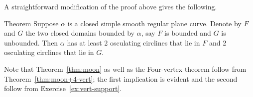 A straightforward modification of the proof above gives the following.

\begin{thm}{Theorem}\label{thm:moon+4-vert}
Suppose $\alpha$ is a closed simple smooth regular plane curve.
Denote by $F$ and $G$ the two closed domains bounded by $\alpha$, say $F$ is bounded and $G$ is unbounded.  
Then $\alpha$ has at least 2 osculating circlines that lie in $F$
and  2 osculating circlines that lie in $G$. 
\end{thm}

Note that Theorem~\ref{thm:moon} as well as the Four-vertex theorem \label{thm:4-vert} follow from Theorem~\ref{thm:moon+4-vert};
the first implication is evident and the second follow from Exercise~\ref{ex:vert-support}.


